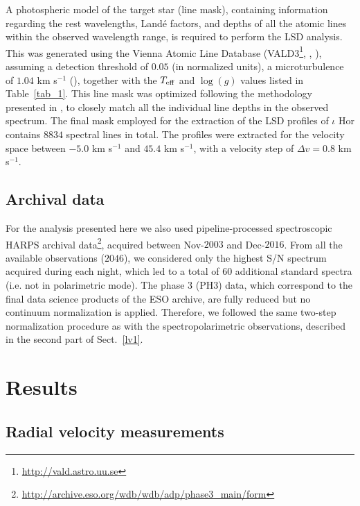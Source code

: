 \documentclass[a4paper,fleqn,usenatbib]{mnras}
\begin{document}
A photospheric model of the target star (line mask), containing information regarding the rest wavelengths, Land\'e factors, and depths of all the atomic lines within the observed wavelength range, is required to perform the LSD analysis. This was generated using the Vienna Atomic Line Database (VALD3\footnote[6]{\url{http://vald.astro.uu.se}}, , ), assuming a detection threshold of $0.05$ (in normalized units), a microturbulence of $1.04$ km s$^{-1}$ (), together with the $T_{\rm eff}$ and $\log(g)$ values listed in Table~\ref{tab_1}. This line mask was optimized following the methodology presented in , to closely match all the individual line depths in the observed spectrum. The final mask employed for the extraction of the LSD profiles of $\iota$ Hor contains $8834$ spectral lines in total. The profiles were extracted for the velocity space between $-5.0$ km s$^{-1}$ and $45.4$ km s$^{-1}$, with a velocity step of $\Delta v = 0.8$ km s$^{-1}$. 

\subsection{Archival data}\label{sec_archival}
 
For the analysis presented here we also used pipeline-processed spectroscopic HARPS archival data\footnote[7]{\url{http://archive.eso.org/wdb/wdb/adp/phase3_main/form}}, acquired between Nov-$2003$ and Dec-$2016$. From all the available observations ($2046$), we considered only the highest S/N spectrum acquired during each night, which led to a total of $60$ additional standard spectra (i.e. not in polarimetric mode). The phase 3 (PH3) data, which correspond to the final data science products of the ESO archive, are fully reduced but no continuum normalization is applied. Therefore, we followed the same two-step normalization procedure as with the spectropolarimetric observations, described in the second part of Sect.~\ref{lv1}.     

\section{Results}\label{sect_4}

\subsection{Radial velocity measurements}\label{sec_RV}
\end{document}
